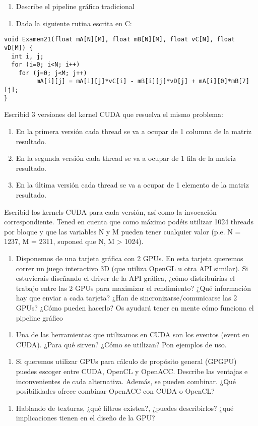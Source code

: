 
\newcommand{\pregunta}[1]{
    \begin{enumerate}[resume]
        \item #1
    \end{enumerate}
}

\pregunta{Describe el pipeline gráfico tradicional}

\pregunta{Dada la siguiente rutina escrita en C:}

\begin{verbatim}
void Examen21(float mA[N][M], float mB[N][M], float vC[N], float vD[M]) {
  int i, j;
  for (i=0; i<N; i++)
    for (j=0; j<M; j++)
         mA[i][j] = mA[i][j]*vC[i] - mB[i][j]*vD[j] + mA[i][0]*mB[7][j];
}
\end{verbatim}

Escribid 3 versiones del kernel CUDA que resuelva el mismo problema:

\begin{enumerate}[label=(\alph*)]
    \item En la primera versión cada thread se va a ocupar de 1 columna de la matriz resultado.
    \item En la segunda versión cada thread se va a ocupar de 1 fila de la matriz resultado.
    \item En la última versión cada thread se va a ocupar de 1 elemento de la matriz resultado.
\end{enumerate}

Escribid los kernels CUDA para cada versión, así como la invocación
correspondiente. Tened en cuenta que como máximo podéis utilizar 1024 threads
por bloque y que las variables N y M pueden tener cualquier valor (p.e. N =
1237, M = 2311, suponed que N, M > 1024).

\pregunta{Disponemos de una tarjeta gráfica con 2 GPUs. En esta tarjeta queremos
    correr un juego interactivo 3D (que utiliza OpenGL u otra API similar). Si
    estuvierais diseñando el driver de la API gráfica, ¿cómo distribuirías el
    trabajo entre las 2 GPUs para maximizar el rendimiento?  ¿Qué información
    hay que enviar a cada tarjeta? ¿Han de sincronizarse/comunicarse las 2 GPUs?
    ¿Cómo pueden hacerlo? Os ayudará tener en mente cómo funciona el pipeline
gráfico}

\pregunta{Una de las herramientas que utilizamos en CUDA son los eventos (event en
CUDA). ¿Para qué sirven? ¿Cómo se utilizan? Pon ejemplos de uso.}

\pregunta{Si queremos utilizar GPUs para cálculo de propósito general (GPGPU)
    puedes escoger entre CUDA, OpenCL y OpenACC. Describe las ventajas e
    inconvenientes de cada alternativa.  Además, se pueden combinar. ¿Qué
posibilidades ofrece combinar OpenACC con CUDA o OpenCL?}

\pregunta{Hablando de texturas, ¿qué filtros existen?, ¿puedes describirlos? ¿qué
implicaciones tienen en el diseño de la GPU?}

\pagebreak


\pagebreak

